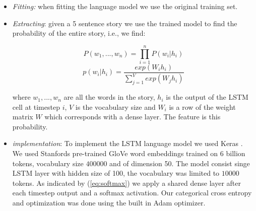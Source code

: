 \documentclass{article}
\begin{document}
\begin{itemize}

	\item \textit{Fitting:} when fitting the language model we use the original training set.

	\item \textit{Extracting}: given a 5 sentence story we use the trained
            model to find the probability of the entire story, i.e., we find:

	\begin{multicols}{2}
		\begin{equation}
		P(w_1, ..., w_n) = \prod_{i=1}^{n} P(w_i|h_i)
		\end{equation}\break
		\begin{equation}
		\label{eq:softmax}
		p(w_i|h_i) = \frac{exp(W_ih_i)}{\sum_{j=1}^{V}exp(W_jh_i)}
		\end{equation}
	\end{multicols}

        where $w_1, ..., w_n$ are all the words in the story, $h_i$ is the
        output of the LSTM cell at timestep $i$, $V$ is the vocabulary size and
        $W_i$ is a row of the weight matrix $W$ which corresponds with a dense
        layer. The feature is this probability.
	
        \item \textit{implementation}: To implement the LSTM language model we
            used Keras \cite{KERAS}. We used Stanfords pre-trained GloVe word
            embeddings trained on 6 billion tokens, vocabulary size $400000$ and
            of dimension 50. The model consist singe LSTM layer with hidden size
            of 100, the vocabulary was limited to $10 000$ tokens. As indicated
            by (\ref{eq:softmax}) we apply a shared dense layer after each
            timestep output and a softmax activation. Our categorical cross
            entropy and optimization was done using the built in Adam optimizer.
	
\end{itemize}
\end{document}
